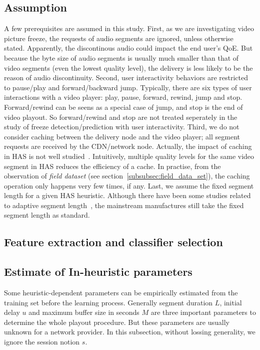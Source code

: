 \documentclass[journal]{IEEEtran}
\begin{document}
\subsection{Assumption}
A few prerequisites are assumed in this study. First, as we are investigating video picture freeze, the requests of audio segments are ignored, unless otherwise stated. Apparently, the discontinous audio could impact the end user's QoE. But because the byte size of audio segments is usually much smaller than that of video segments (even the lowest quality level), the delivery is less likely to be the reason of audio discontinuity. Second, user interactivity behaviors are restricted to pause/play and forward/backward jump. Typically, there are six types of user interactions with a video player: play, pause, forward, rewind, jump and stop. Forward/rewind can be seens as a special case of jump, and stop is the end of video playout. So forward/rewind and stop are not treated seperately in the study of freeze detection/prediction with user interactivity. Third, we do not consider caching between the delivery node and the video player; all segment requests are received by the CDN/network node. Actually, the impact of caching in HAS is not well studied~\cite{lee2014caching}. Intuitively, multiple quality levels for the same video segment in HAS reduces the efficiency of a cache. In practise, from the observation of {\it field dataset} (see section~\ref{subsubsec:field_data_set}), the caching operation only happens very few times, if any. Last, we assume the fixed segment length for a given HAS heuristic. Although there have been some studies related to adaptive segment length~\cite{adzic2012optimizing, lievens2013optimized}, the mainstream manufactures still take the fixed segment length as standard. 

\subsection{Feature extraction and classifier selection}
\label{subsec:feature_extraction}
\subsection{Estimate of In-heuristic parameters}
Some heuristic-dependent parameters can be empirically estimated from the training set before the learning process. Generally segment duration $L$, initial delay $u$ and maximum buffer size in seconds $M$ are three important parameters to determine the whole playout procedure. But these parameters are usually unknown for a network provider. In this subsection, without lossing generality, we ignore the session notion $s$.
\end{document}

